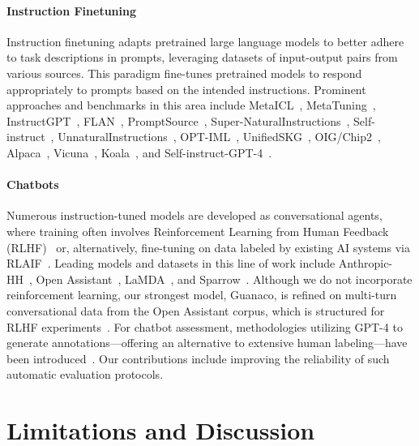 \paragraph{Instruction Finetuning} Instruction finetuning adapts pretrained large language models to better adhere to task descriptions in prompts, leveraging datasets of input-output pairs from various sources. This paradigm fine-tunes pretrained models to respond appropriately to prompts based on the intended instructions. Prominent approaches and benchmarks in this area include MetaICL~\citep{min2021metaicl}, MetaTuning~\citep{zhong2021adapting}, InstructGPT~\citep{ouyang2022training}, FLAN~\citep{wei2021finetuned,chung2022scaling}, PromptSource~\citep{bach2022promptsource}, Super-NaturalInstructions~\citep{wang2022super,sanh2021multitask}, Self-instruct~\citep{wang2022self}, UnnaturalInstructions~\citep{honovich2022unnatural}, OPT-IML~\citep{iyer2022opt}, UnifiedSKG~\citep{xie2022unifiedskg}, OIG/Chip2~\citep{laion2023}, Alpaca~\citep{alpaca}, Vicuna~\citep{vicuna2023}, Koala~\citep{koala_blogpost_2023}, and Self-instruct-GPT-4~\citep{peng2023instruction}.

\paragraph{Chatbots} Numerous instruction-tuned models are developed as conversational agents, where training often involves Reinforcement Learning from Human Feedback (RLHF)~\citep{christiano2017deep} or, alternatively, fine-tuning on data labeled by existing AI systems via RLAIF~\citep{bai2022constitutional}. Leading models and datasets in this line of work include Anthropic-HH~\citep{askell2021general,bai2022training}, Open Assistant~\citep{kopf2023openassistant}, LaMDA~\citep{thoppilan2022lamda}, and Sparrow~\citep{glaese2022improving}. Although we do not incorporate reinforcement learning, our strongest model, Guanaco, is refined on multi-turn conversational data from the Open Assistant corpus, which is structured for RLHF experiments~\citep{kopf2023openassistant}. For chatbot assessment, methodologies utilizing GPT-4 to generate annotations—offering an alternative to extensive human labeling—have been introduced~\citep{vicuna2023,peng2023instruction}. Our contributions include improving the reliability of such automatic evaluation protocols.

\section{Limitations and Discussion}

